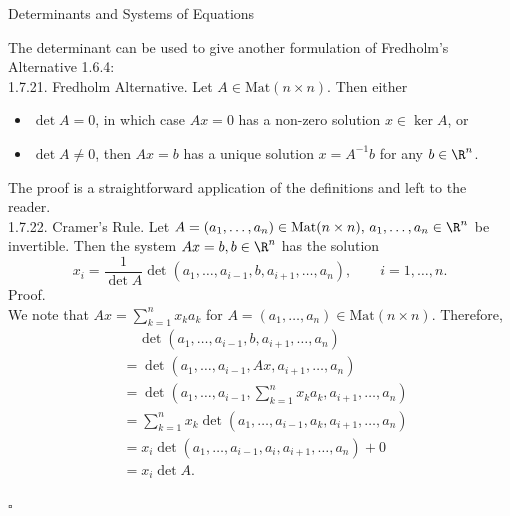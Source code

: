 \documentclass[smaller,hyperref={CJKbookmarks=true}]{beamer}
\begin{document}
\begin{frame}{Determinants and Systems of Equations}
\begin{spacing}{1.05}
The determinant can be used to give another formulation of Fredholm's
Alternative 1.6.4:\\[6pt]
\alert{1.7.21. Fredholm Alternative.} Let $A\in\text{Mat}(n\times n).$ Then either
\begin{itemize}
  \item $\det A=0$, in which case $Ax=0$ has a non-zero solution $x\in\ker A$, or
  \item $\det A\neq0$, then $Ax=b$ has a unique solution $x=A^{-1}b$ for any $b\in\R^n$.
\end{itemize}
The proof is a straightforward application of the definitions and left to the reader.\\[6pt]
\alert{1.7.22. Cramer's Rule.} Let $A=(a_1,\ldots,a_n)\in\text{Mat}(n\times n),\,a_1,\ldots,a_n\in\R^n$ be invertible. Then the system $Ax=b,b\in\R^n$ has the solution
\begin{equation}\label{1.7.20}
  x_i=\frac{1}{\det A}\det(a_1,\ldots,a_{i-1},b,a_{i+1},\ldots,a_n),\qquad i=1,\ldots,n.
\end{equation}
\newpage
\alert{Proof.}\\
We note that $Ax=\sum\limits_{k=1}^{n}x_ka_k$ for $A=(a_1,\ldots,a_n)\in\text{Mat}(n\times n)$. Therefore,
\begin{equation*}
  \begin{split}
       &~~~~~\det(a_1,\ldots,a_{i-1},b,a_{i+1},\ldots,a_n)  \\
       &=\det(a_1,\ldots,a_{i-1},Ax,a_{i+1},\ldots,a_n)  \\
       &=\det\left(a_1,\ldots,a_{i-1},\sum_{k=1}^{n}x_ka_k,a_{i+1},\ldots,a_n\right)  \\
       &=\sum_{k=1}^{n}x_k \det(a_1,\ldots,a_{i-1},a_k,a_{i+1},\ldots,a_n)  \\
       &=x_i\det(a_1,\ldots,a_{i-1},a_i,a_{i+1},\ldots,a_n)+0  \\
       &=x_i\det A.
  \end{split}
\end{equation*}
\begin{flushright}
  $\square$
\end{flushright}
\end{spacing}
\end{frame}
\end{document}
